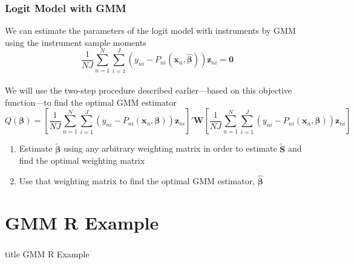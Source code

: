 \documentclass{beamer}\usepackage[]{graphicx}\usepackage[]{xcolor}
\begin{document}
\begin{frame}\frametitle{Logit Model with GMM}
    We can estimate the parameters of the logit model with instruments by GMM using the instrument sample moments
    $$\frac{1}{NJ} \sum_{n = 1}^N \sum_{i = 1}^J \left( y_{ni} - P_{ni}(\bm{x}_n, \widehat{\bm{\beta}}) \right) \bm{z}_{ni} = \bm{0}$$ \\
    \vspace{2ex}
    We will use the two-step procedure described earlier---based on this objective function---to find the optimal GMM estimator \\
    \vspace{1ex}
    {\scriptsize $$Q(\bm{\beta}) = \left[ \frac{1}{NJ} \sum_{n = 1}^N \sum_{i = 1}^J \left( y_{ni} - P_{ni}(\bm{x}_n, \bm{\beta}) \right) \bm{z}_{ni} \right]' \bm{W} \left[ \frac{1}{NJ} \sum_{n = 1}^N \sum_{i = 1}^J \left( y_{ni} - P_{ni}(\bm{x}_n, \bm{\beta}) \right) \bm{z}_{ni} \right]$$}
    \begin{enumerate}
    	\item Estimate $\widetilde{\bm{\beta}}$ using any arbitrary weighting matrix in order to estimate $\widetilde{\bm{S}}$ and find the optimal weighting matrix
    	\item Use that weighting matrix to find the optimal GMM estimator, $\widehat{\bm{\beta}}$
    \end{enumerate}
\end{frame}

\section{GMM R Example}
\label{example}
\begin{frame}\frametitle{}
    \vfill
    \centering
    \begin{beamercolorbox}[center]{title}
        \Large GMM R Example
    \end{beamercolorbox}
    \vfill
\end{frame}
\end{document}
